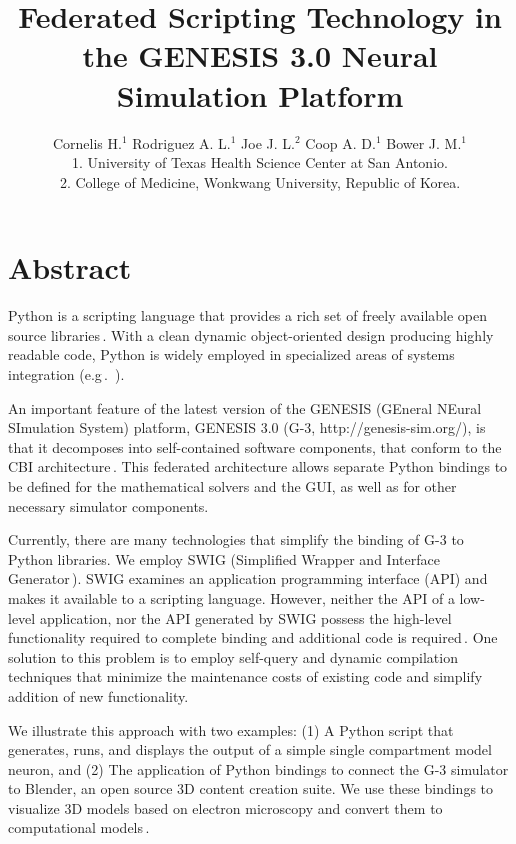 \documentclass[12pt]{article}
\begin{document}
\title{Federated Scripting Technology in the GENESIS 3.0 Neural
  Simulation Platform}

\author{Cornelis H.$^1$ Rodriguez A. L.$^1$ Joe J. L.$^2$ Coop A. D.$^1$ Bower J. M.$^1$\\
  {\small 1. University of Texas Health Science Center at San Antonio.} \\
  {\small 2. College of Medicine, Wonkwang University, Republic of Korea.}
}

\maketitle
{}
\section*{Abstract}
Python is a scripting language that provides a rich set of freely
available open source
libraries\,\cite{langtangen04:_python_scrip_comput_scien}. With a
clean dynamic object-oriented design producing highly readable code,
Python is widely employed in specialized areas of systems integration
(e.g\,.~\cite{thiruvathukal01:_web_progr_python}).

An important feature of the latest version of the GENESIS (GEneral
NEural SImulation System) platform, GENESIS 3.0 (G-3, http://genesis-sim.org/), is that it
decomposes into self-contained software components, that conform to the
CBI architecture\,\cite{cornelis08:_cbi_archit_comput_simul_realis}.
This federated architecture allows separate Python bindings to be
defined for the mathematical solvers and the GUI, as well as for other
necessary simulator components.

Currently, there are many technologies that simplify the binding of G-3
to Python libraries.  We employ SWIG (Simplified Wrapper and Interface
Generator\,\cite{08:_simpl_wrapp_inter_gener}).  SWIG examines an
application programming interface (API) and makes it available to a scripting language.
However, neither the API of a low-level application, nor the API
generated by SWIG possess the high-level functionality required to
complete binding and additional code is
required\,\cite{08:_swig_python}. One solution to this problem is to employ self-query and dynamic
compilation techniques that minimize the maintenance costs of existing code
and simplify addition of new functionality.

We illustrate this approach with two examples: (1) A Python script that
generates, runs, and displays the output of a simple single
compartment model neuron, and (2) The application of Python bindings
to connect the G-3 simulator to Blender, an open source 3D content
creation suite.  We use these bindings to visualize 3D models based on
electron microscopy and convert them to computational
models\,\cite{cornelis08:_model_neuros_genes}.
\end{document}

